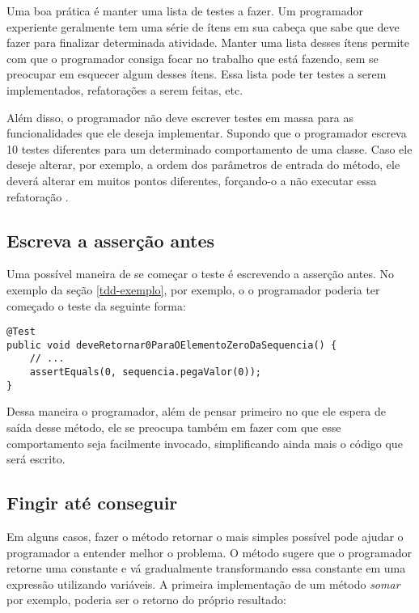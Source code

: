 Uma boa prática é manter uma lista de testes a fazer. Um programador experiente geralmente tem uma série de ítens em sua cabeça
que sabe que deve fazer para finalizar determinada atividade. Manter uma lista desses ítens permite com que o programador 
consiga focar no trabalho que está fazendo, sem se preocupar em esquecer algum desses ítens. 
Essa lista pode ter testes a serem implementados, refatorações a serem feitas, etc. 

Além disso, o programador não deve escrever testes em massa para as funcionalidades que ele deseja implementar. Supondo que o programador
escreva 10 testes diferentes para um determinado comportamento de uma classe. Caso ele deseje alterar, por exemplo, a ordem dos parâmetros
de entrada do método, ele deverá alterar em muitos pontos diferentes, forçando-o a não executar essa refatoração \cite{TDDByExample}.

\subsection{Escreva a asserção antes}

Uma possível maneira de se começar o teste é escrevendo a asserção antes. No exemplo da seção \ref{tdd-exemplo}, por exemplo, o 
o programador poderia ter começado o teste da seguinte forma:

\begin{lstlisting}[frame=trbl]
@Test
public void deveRetornar0ParaOElementoZeroDaSequencia() {
	// ...
	assertEquals(0, sequencia.pegaValor(0));
}
\end{lstlisting}

Dessa maneira o programador, além de pensar primeiro no que ele espera de saída desse método, ele se preocupa também 
em fazer com que esse comportamento seja facilmente invocado, simplificando ainda mais o código que será escrito. 

\subsection{Fingir até conseguir}
\label{sec:fake-it}

Em alguns casos, fazer o método retornar o mais simples possível pode ajudar o programador a entender melhor o problema.
O método sugere que o programador retorne uma constante e vá gradualmente transformando essa constante em uma expressão
utilizando variáveis. A primeira implementação de um método \textit{somar} por exemplo, poderia ser o retorno do 
próprio resultado:

